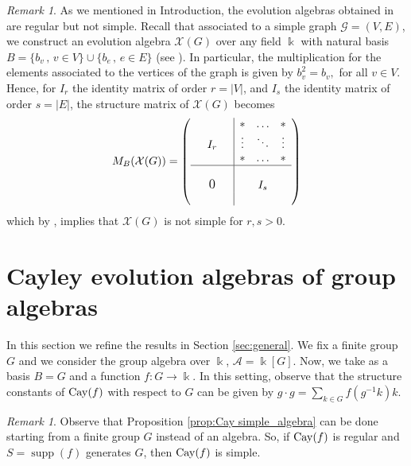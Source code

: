 \documentclass[a4paper,12pt]{amsart}
\theoremstyle{definition}
\theoremstyle{remark}
\newtheorem{remark}[theorem]{Remark}
\newcommand{\Cay}{{\rm Cay}}
\newcommand{\supp}{\operatorname{supp}}
\newcommand{\A}{\mathcal{A}}
\begin{document}
\begin{remark}\label{notsimple}
As we mentioned in Introduction,  the evolution algebras obtained in \cite{cmv3} are regular but not simple. Recall that associated to a simple graph $\mathcal G = (V,E)$, we construct an evolution algebra $\mathcal X (G)$ over any field $\Bbbk$ with natural basis $B = \{b_v\,,\, v \in V\} \cup \{b_e \,,\,e \in E\}$ (see \cite[Definition 3.2]{cmv3}). In particular, the multiplication for the elements associated to the vertices of the graph is given by $b_v^2 = b_v,$ for all $v \in V$. Hence, for  $I_r$ the identity matrix of order $r= |V|$, and $I_s$ the identity matrix of order $s=|E|$, the structure matrix of   $\mathcal X (G)$  becomes
	$$M_B(\mathcal X (G))=\left(
	\begin{array}{ccc|ccc}
	  &    &    & * & \ldots & *\\
	  &  I_r &    & \vdots  & \ddots & \vdots\\
	  &    &    & *  & \ldots  & *\\
	\hline
	 & &   &  &   & \\
	 &\text{\large 0}&  & & I_s & \\
	 && & &   & \\
	\end{array}
	\right) $$	
which by \cite[Corollary 4.6]{Cabrera-Siles-Velasco}, implies that $\mathcal X (G)$ is  not simple for $r,s>0$. 


\end{remark}

\section{Cayley evolution algebras of group algebras}\label{sec:cayleygroupalgebras}

In this section we refine the results in Section \ref{sec:general}. We fix a finite group $G$ and we consider the group algebra over $\Bbbk$, $\A=\Bbbk[G]$. Now, we take as a basis $B=G$ and a function $f:G\rightarrow\Bbbk.$
In this setting, observe that the structure constants of  $\Cay(f)$ with respect to $G$ can be given by $g\cdot g=\sum_{k\in G}f(g^{-1}k)k$.

\if{}%
\begin{remark}\label{remark:Cay_simple}
Observe that Proposition \ref{prop:Cay simple_algebra} can be done starting from a finite group $G$ instead of an algebra. So, if $\Cay(f)$ is regular and $S=\supp(f)$ generates $G$, then $\Cay(f)$ is simple.
\end{remark}
\fi
\end{document}
